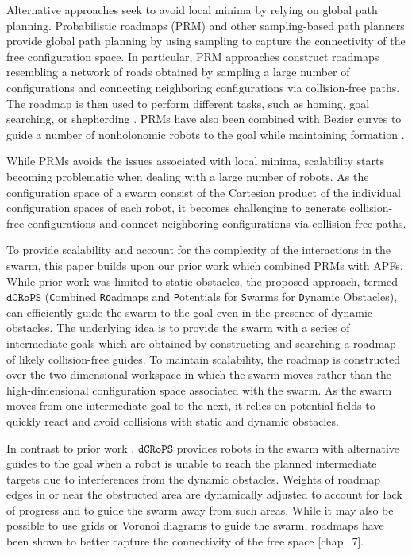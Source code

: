 \documentclass[letterpaper, 10pt, conference]{ieeeconf}
\newcommand{\Acronym}[1]{\ensuremath{{{\texttt{#1}}}}}
\newcommand{\Name}{\Acronym{dCRoPS}}
\begin{document}
Alternative approaches seek to avoid local minima by relying on global
path planning. Probabilistic roadmaps (PRM) \cite{PRM} and other
sampling-based path planners
\cite{RRT,RRTRecent1,TogglePRM,UOBPRM,PlakuTRO10} provide global path
planning by using sampling to capture the connectivity of the free
configuration space. In particular, PRM approaches construct roadmaps
resembling a network of roads obtained by sampling a large number of
configurations and connecting neighboring configurations via
collision-free paths.  The roadmap is then used to perform different
tasks, such as homing, goal searching, or shepherding
\cite{LienSwarming,LienShepherding}.  PRMs have also been combined
with Bezier curves to guide a number of nonholonomic robots to the
goal while maintaining formation \cite{KostasSwarm}.

While PRMs avoids the issues associated with local minima, scalability
starts becoming problematic when dealing with a large number of
robots. As the configuration space of a swarm consist of the Cartesian
product of the individual configuration spaces of each robot, it
becomes challenging to generate collision-free configurations and
connect neighboring configurations via collision-free paths.

To provide scalability and account for the complexity of the
interactions in the swarm, this paper builds upon our prior work
\cite{PlakuTAROS13boids} which combined PRMs with APFs. While prior
work was limited to static obstacles, the proposed approach, termed
$\Name$ (\texttt{C}ombined \texttt{Ro}admaps and \texttt{P}otentials
for \texttt{S}warms for \texttt{D}ynamic Obstacles), can efficiently
guide the swarm to the goal even in the presence of dynamic obstacles.
The underlying idea is to provide the swarm with a series of
intermediate goals which are obtained by constructing and searching a
roadmap of likely collision-free guides. To maintain scalability, the
roadmap is constructed over the two-dimensional workspace in which the
swarm moves rather than the high-dimensional configuration space
associated with the swarm. As the swarm moves from one intermediate
goal to the next, it relies on potential fields to quickly react and
avoid collisions with static and dynamic obstacles.  


In contrast to prior work \cite{PlakuTAROS13boids}, $\Name$ provides
robots in the swarm with alternative guides to the goal when a robot
is unable to reach the planned intermediate targets due to
interferences from the dynamic obstacles. Weights of roadmap edges in
or near the obstructed area are dynamically adjusted to account for
lack of progress and to guide the swarm away from such areas.  While
it may also be possible to use grids or Voronoi diagrams to guide the
swarm, roadmaps have been shown to better capture the connectivity of
the free space \cite{book:MP}[chap.~7]. %
 
\end{document}
